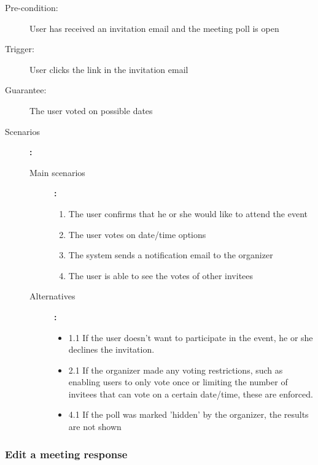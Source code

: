 \begin{description}
	\item[Pre-condition:] User has received an invitation email and the meeting poll is open
	\item[Trigger:] User clicks the link in the invitation email
	\item[Guarantee:] The user voted on possible dates
	\item[Scenarios]\textbf{:}\\
				\begin{description}
					\item[Main scenarios]\textbf{:}\\
								\begin{enumerate}
									\item The user confirms that he or she would like to attend the event
									\item The user votes on date/time options
									\item The system sends a notification email to the organizer
									\item The user is able to see the votes of other invitees
								\end{enumerate}
					\item[Alternatives]\textbf{:}\\
								\begin{itemize}
									\item 1.1 If the user doesn't want to participate in the event, he or she declines the invitation.	
									\item 2.1 If the organizer made any voting restrictions, such as enabling users to only vote once or limiting the number of invitees that can vote on a certain date/time, these are enforced.
									\item 4.1 If the poll was marked 'hidden' by the organizer, the results are not shown
								\end{itemize}
				\end{description}
\end{description}

\subsubsection{Edit a meeting response}

